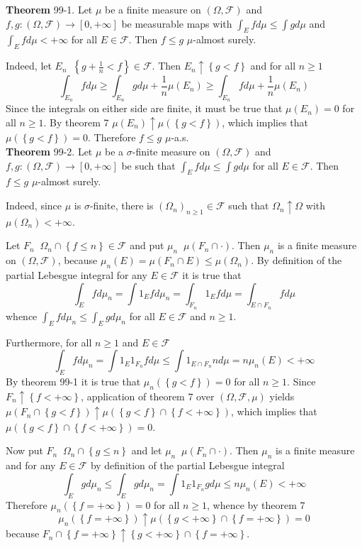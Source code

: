 \documentclass[a4paper]{article}
\newcommand{\obj}[1]{\left\{ #1 \right \}}
\newcommand{\clo}[1]{\left [ #1 \right ]}
\newcommand{\brac}[1]{\left ( #1 \right )}
\newcommand{\Zinf}{\clo{ 0, +\infty }}
\newcommand{\Fcal}{\mathcal{F}}
\newcommand{\defn}{\mathop{\overset{\Delta}{=}}\nolimits}
\begin{document}
\label{thm:int_ineq_muas_finite} \noindent \textbf{Theorem} 99-1.
Let $\mu$ be a finite measure on $\brac{\Omega, \Fcal}$ and $f,g:\brac{\Omega, \Fcal}\to \Zinf$ be measurable maps with $\int_E f d\mu \leq \int g d\mu$ and $\int_E f d\mu < +\infty$ for all $E\in \Fcal$. Then $f\leq g$ $\mu$-almost surely.

Indeed, let $E_n\defn \obj{g+\frac{1}{n}<f}\in \Fcal$. Then $E_n\uparrow \obj{g<f}$ and for all $n\geq1$ \[\int_{E_n} f d\mu \geq \int_{E_n} g d\mu + \frac{1}{n}\mu\brac{E_n}\geq \int_{E_n} f d\mu + \frac{1}{n}\mu\brac{E_n}\] Since the integrals on either side are finite, it must be true that $\mu\brac{E_n}=0$ for all $n\geq1$. By theorem 7 $\mu\brac{E_n}\uparrow \mu\brac{\obj{g<f}}$, which implies that $\mu\brac{\obj{g<f}}=0$. Therefore $f\leq g$ $\mu$-a.s.\\

\label{thm:int_ineq_muas} \noindent \textbf{Theorem} 99-2.
Let $\mu$ be a $\sigma$-finite measure on $\brac{\Omega, \Fcal}$ and $f,g:\brac{\Omega, \Fcal}\to \Zinf$ be such that $\int_E f d\mu \leq \int g d\mu$ for all $E\in \Fcal$. Then $f\leq g$ $\mu$-almost surely.

Indeed, since $\mu$ is $\sigma$-finite, there is $\brac{\Omega_n}_{n\geq1}\in \Fcal$ such that $\Omega_n\uparrow \Omega$ with $\mu\brac{\Omega_n} < +\infty$.

Let $F_n\defn \Omega_n \cap \obj{f\leq n}\in \Fcal$ and put $\mu_n\defn \mu\brac{F_n\cap \cdot}$. Then $\mu_n$ is a finite measure on $\brac{\Omega, \Fcal}$, because $\mu_n\brac{E}=\mu\brac{F_n\cap E}\leq \mu\brac{\Omega_n}$. By definition of the partial Lebesgue integral for any $E\in \Fcal$ it is true that \[\int_E f d\mu_n = \int 1_E f d\mu_n = \int_{F_n} 1_E f d\mu = \int_{E\cap F_n} f d\mu\] whence $\int_E f d\mu_n \leq \int_E g d\mu_n$ for all $E\in \Fcal$ and $n\geq 1$.

Furthermore, for all $n\geq 1$ and $E\in\Fcal$ \[\int_E f d\mu_n = \int 1_E 1_{F_n} f d\mu \leq \int 1_{E\cap F_n} n d\mu = n\mu_n\brac{E}<+\infty\] By theorem 99-1 it is true that $\mu_n\brac{\obj{g<f}}=0$ for all $n\geq1$. Since $F_n\uparrow \obj{f<+\infty}$, application of theorem 7 over $\brac{\Omega, \Fcal, \mu}$ yields $\mu\brac{F_n\cap \obj{g<f}}\uparrow \mu\brac{\obj{g<f}\cap \obj{f<+\infty}}$, which implies that $\mu\brac{\obj{g<f}\cap \obj{f<+\infty}}=0$.

Now put $F_n\defn \Omega_n \cap \obj{g\leq n}$ and let $\mu_n\defn \mu\brac{F_n\cap \cdot}$. Then $\mu_n$ is a finite measure and for any $E\in \Fcal$ by definition of the partial Lebesgue integral \[\int_E g d\mu_n\leq \int_E g d\mu_n = \int 1_E 1_{F_n} g d\mu\leq n\mu_n\brac{E}<+\infty\] Therefore $\mu_n\brac{\obj{f=+\infty}} = 0$ for all $n\geq 1$, whence by theorem 7 \[\mu_n\brac{\obj{f=+\infty}}\uparrow \mu\brac{\obj{g<+\infty}\cap \obj{f=+\infty}}=0\] because $F_n\cap \obj{f=+\infty}\uparrow \obj{g<+\infty}\cap \obj{f=+\infty}$.
\end{document}
